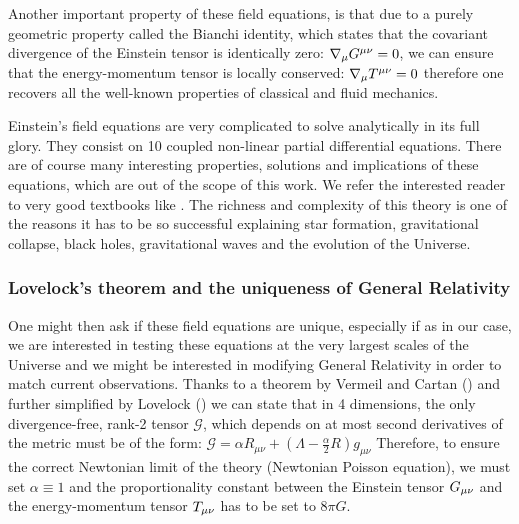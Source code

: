 Another important property of these field equations, is that due to a purely geometric property called the Bianchi identity, which
states that the covariant divergence of the Einstein tensor is identically zero:
$\nabla_{\mu} G^{\mu \nu} = 0$, 
we can ensure that the energy-momentum tensor is locally conserved:
\beeqc$
\nabla_{\mu} T^{\mu \nu} = 0
$
therefore one recovers all the well-known properties of classical and fluid mechanics.

Einstein's field equations are very complicated to solve analytically in its full glory. They consist on
10 coupled non-linear partial differential equations.
There are of course many interesting properties, solutions and implications of these equations, 
which are out of the scope of this work.
We refer the interested reader to very good textbooks like \cite{Carroll, Schultz, Misner, Thorne, Wheeler, Wald}.
The richness and complexity of this theory is one of the reasons it has to be so successful explaining 
star formation, gravitational collapse, black holes, gravitational waves and the evolution of the Universe.

\subsubsection{Lovelock's theorem and the uniqueness of General Relativity}

One might then ask if these field equations are unique, especially if as in our case, 
we are interested in testing these equations at the very largest scales of the Universe and we might 
be interested in modifying General Relativity in order to match current observations.
Thanks to a theorem by Vermeil and Cartan (\cite{cite Vermeil, Cartan, 1921}) 
and further simplified by Lovelock (\cite{1970, Lovelock}) we can state that in 4 dimensions,
the only divergence-free, rank-2 tensor $\mathcal{G}$, which depends on at most second derivatives
of the metric must be of the form:
\beeqp$
\mathcal{G} =  \alpha R_{\mu \nu} + \left( \Lambda - \frac{\alpha}{2} R \right) g_{\mu \nu}
$
Therefore, to ensure the correct Newtonian limit of the theory (Newtonian Poisson equation), we must set $\alpha \equiv 1$
and the proportionality constant between the Einstein tensor $G_{\mu \nu}$  and the energy-momentum tensor
$T_{\mu \nu}$ has to be set to $8 \pi G$.





\subsection{}

